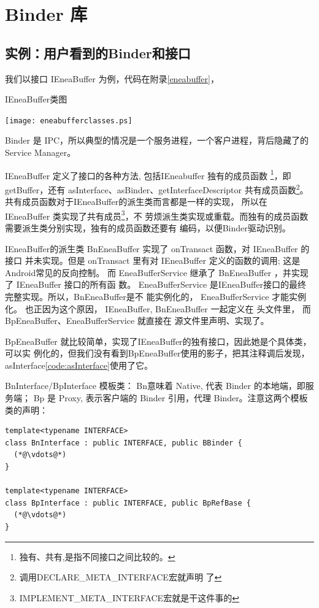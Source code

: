 \documentclass[a4paper,11pt]{article}
\begin{document}
\section{Binder 库}
\subsection{实例：用户看到的Binder和接口}

我们以接口 IEneaBuffer 为例，代码在附录\ref{eneabuffer}，

\caption{IEneaBuffer类图}
\texttt{[image: eneabufferclasses.ps]}

Binder 是 IPC，所以典型的情况是一个服务进程，一个客户进程，背后隐藏了的Service
Manager。

IEneaBuffer 定义了接口的各种方法, 包括IEneabuffer 独有的成员函数
\footnote{独有、共有,是指不同接口之间比较的。}，即 getBuffer，还有 
asInterface、asBinder、getInterfaceDescriptor 共有成员函数\footnote{调用DECLARE_META_INTERFACE宏就声明
了}。
共有成员函数对于IEneaBuffer的派生类而言都是一样的实现，
所以在 IEneaBuffer 类实现了共有成员\footnote{IMPLEMENT_META_INTERFACE宏就是干这件事的}，不
劳烦派生类实现或重载。而独有的成员函数需要派生类分别实现，独有的成员函数还要有
编码，以便Binder驱动识别。

IEneaBuffer的派生类 BnEneaBuffer 实现了 onTransact 函数，对 IEneaBuffer 的接口
并未实现。但是 onTransact 里有对 IEneaBuffer 定义的函数的调用; 这是Android常见的反向控制。
而 EneaBufferService 继承了 BnEneaBuffer ，并实现了 IEneaBuffer 接口的所有函
数。 EneaBufferService 是IEneaBuffer接口的最终完整实现。所以，BnEneaBuffer是不
能实例化的， EneaBufferService 才能实例化。 也正因为这个原因， IEneaBuffer,
BnEneaBuffer 一起定义在 头文件里， 而 BpEneaBuffer、EneaBufferService 就直接在
源文件里声明、实现了。


BpEneaBuffer 就比较简单，实现了IEneaBuffer的独有接口，因此她是个具体类，可以实
例化的，但我们没有看到BpEneaBuffer使用的影子，把其注释调后发现，asInterface\ref{code:asInterface}使用了它。


BnInterface/BpInterface 模板类：
Bn意味着 Native, 代表 Binder 的本地端，即服务端； Bp 是 Proxy, 表示客户端的
Binder 引用，代理 Binder。注意这两个模板类的声明：
\begin{lstlisting}
template<typename INTERFACE>
class BnInterface : public INTERFACE, public BBinder {
  (*@\vdots@*)
}

template<typename INTERFACE>
class BpInterface : public INTERFACE, public BpRefBase {
  (*@\vdots@*)
}
\end{lstlisting}
\end{document}
